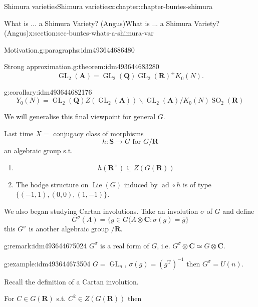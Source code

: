 \documentclass[oneside,10pt,]{book}
\numberwithin{equation}{section}
\DeclareMathOperator{\Lie}{Lie}
\newcommand{\inv}{^{-1}}
\newcommand{\QQ}{\mathbf{Q}}
\newcommand{\RR}{\mathbf{R}}
\newcommand{\CC}{\mathbf{C}}
\newcommand{\adeles}{\mathbf{A}}
\newcommand{\transpose}{\mathrm{T}}
\DeclareMathOperator{\ad}{ad}
\DeclareMathOperator{\GL}{GL}
\DeclareMathOperator{\specialorthogonal}{SO}
\begin{document}
\begin{chapterptx}{Shimura varieties}{}{Shimura varieties}{}{}{x:chapter:chapter-buntes-shimura}
\begin{sectionptx}{What is ... a Shimura Variety? (Angus)}{}{What is ... a Shimura Variety? (Angus)}{}{}{x:section:sec-buntes-whats-a-shimura-var}
\begin{paragraphs}{Motivation.}{g:paragraphs:idm493644686480}
\begin{equation*}
\end{equation*}
%
\begin{theorem}{Strong approximation.}{}{g:theorem:idm493644683280}%
%
\begin{equation*}
\GL_2(\adeles) = \GL_2(\QQ) \GL_2(\RR)^+ K_0(N)\text{.}
\end{equation*}
%
\end{theorem}
\begin{corollary}{}{}{g:corollary:idm493644682176}%
%
\begin{equation*}
Y_0(N) = \GL_2(\QQ)Z(\GL_2(\adeles)) \backslash \GL_2(\adeles) / K_0(N) \specialorthogonal_2(\RR)
\end{equation*}
%
\end{corollary}
We will generalise this final viewpoint for general \(G\).%
\end{paragraphs}%
\par
Last time \(X = \) conjugacy class of morphisms%
\begin{equation*}
h \colon \mathbf S \to G\text{ for } G/\RR
\end{equation*}
an algebraic group s.t.%
\begin{enumerate}
\item{}%
\begin{equation*}
h(\RR^\times)  \subseteq Z(G(\RR))
\end{equation*}
%
\item{}The hodge structure on \(\Lie(G)\) induced by \(\ad \circ h\) is of type \(\{(-1,1), (0,0), (1,-1)\}\).%
\end{enumerate}
%
\par
We also began studying Cartan involutions. Take an involution \(\sigma\) of \(G\) and define%
\begin{equation*}
G^\sigma(A) = \{ g\in G(A \otimes \CC : \sigma(g) = \bar g\}
\end{equation*}
this \(G^\sigma\) is another algebraic group \(/\RR\).%
\begin{remark}{}{g:remark:idm493644675024}%
\(G^\sigma\) is a real form of \(G\), i.e. \(G^\sigma \otimes \CC \simeq G \otimes \CC\).%
\end{remark}
\begin{example}{}{g:example:idm493644673504}%
\(G  =\GL_n\), \(\sigma(g) = (g^\transpose)\inv\) then \(G^\sigma =  U(n)\).%
\end{example}
Recall the definition of a Cartan involution.%
\par
For \(C \in G(\RR)\) s.t. \(C^2 \in Z(G(\RR))\) then%
\begin{equation*}

\end{equation*}
\end{sectionptx}
\end{chapterptx}
\end{document}
